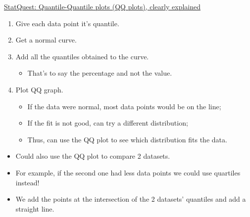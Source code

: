 \documentclass[12pt, titlepage, french]{report}
\begin{document}
\begin{YTB_SUMM}[label = {SQ-BASICS-QQPLOTS}]{\href{https://www.youtube.com/watch?v=okjYjClSjOg&list=PLblh5JKOoLUIcdlgu78MnlATeyx4cEVeR&index=20}{StatQuest: Quantile-Quantile plots (QQ plots), clearly explained}}
\begin{enumerate}
	\item	Give each data point it's quantile.
	\item	Get a normal curve.
	\item	Add all the quantiles obtained to the curve.
	\begin{itemize}
		\item	That's to say the percentage and not the value.
	\end{itemize}
	\item	Plot QQ graph.
	\begin{itemize}
		\item	If the data were normal, most data points would be on the line;
		\item	If the fit is not good, can try a different distribution;
		\item	Thus, can use the QQ plot to see which distribution fits the data.
	\end{itemize}
\end{enumerate}
\begin{itemize}
	\item	Could also use the QQ plot to compare 2 datasets.
	\item	For example, if the second one had less data points we could use quartiles instead!
	\item	We add the points at the intersection of the 2 datasets' quantiles and add a straight line.
\end{itemize}
\end{YTB_SUMM}
\end{document}
